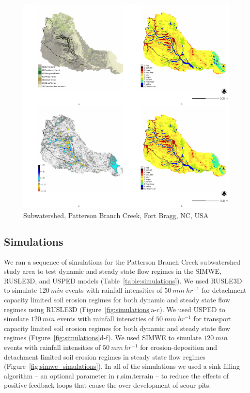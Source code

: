\documentclass[esurf, manuscript]{copernicus}
\begin{document}
\begin{figure}%
\center
\includegraphics[width=\textwidth,height=0.95\textheight,keepaspectratio]{figures/study_area.pdf}
\caption{Subwatershed, Patterson Branch Creek, Fort Bragg, NC, USA}
\label{fig:study_area}
\end{figure}

\subsection{Simulations}
%
We ran a sequence of simulations 
for the Patterson Branch Creek subwatershed study area
to test dynamic and steady state flow regimes
in the SIMWE, RUSLE3D, and USPED models
(Table~\ref{table:simulations}).
%
We used RUSLE3D to simulate $120~min$ events
with rainfall intensities of $50~mm~hr^{-1}$
for detachment capacity limited soil erosion regimes
for both dynamic and steady state flow regimes
using RUSLE3D
(Figure~\ref{fig:simulations}a-c).
% 
We used USPED to simulate $120~min$ events
with rainfall intensities of $50~mm~hr^{-1}$
for transport capacity limited soil erosion regimes
for both dynamic and steady state flow regimes
(Figure~\ref{fig:simulations}d-f).
%
We used SIMWE to simulate $120~min$ events 
with rainfall intensities of $50~mm~hr^{-1}$
for erosion-deposition 
and detachment limited soil erosion regimes 
in steady state flow regimes
(Figure~\ref{fig:simwe_simulations}).
%
In all of the simulations 
we used a sink filling algorithm 
-- an optional parameter in r.sim.terrain --  
to reduce the effects of positive feedback loops
that cause the over-development of scour pits. 
\end{document}
